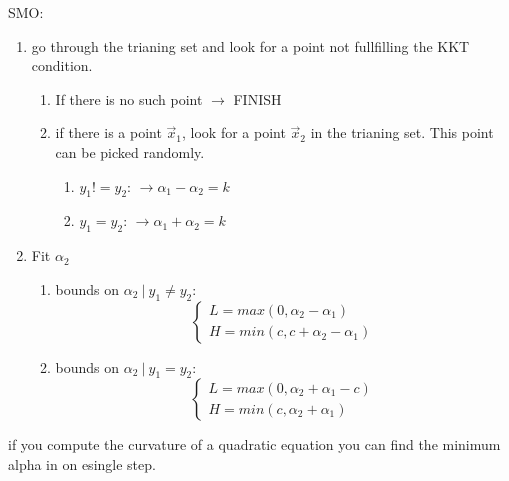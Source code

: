 \documentclass[letterpaper, 9pt]{article}
\begin{document}
SMO:\\
\begin{enumerate}
\item go through the trianing set and look for a point not fullfilling the KKT condition.
\begin{enumerate}
\item If there is no such point $\rightarrow$ FINISH
\item if there is a point $\vec{x}_1$, look for a point $\vec{x}_2$ in the trianing set. This point can be picked randomly.
\begin{enumerate}
\item $y_1 != y_2$: $\rightarrow \alpha_1 - \alpha_2 = k$
\item $y_1 = y_2$: $\rightarrow \alpha_1 + \alpha_2 = k$
\end{enumerate}
\end{enumerate}
\item Fit $\alpha_2$
\begin{enumerate}
\item bounds on $\alpha_2~|~y_1\neq y_2$:
\begin{equation}
\begin{cases}
L = max(0, \alpha_2 - \alpha_1) \\
H = min(c, c + \alpha_2 - \alpha_1)
\end{cases}
\end{equation}
\item bounds on $\alpha_2~|~y_1=y_2$:
\begin{equation}
\begin{cases}
L = max(0, \alpha_2 + \alpha_1- c) \\
H = min(c, \alpha_2 + \alpha_1)
\end{cases}
\end{equation}
\end{enumerate}
\end{enumerate}

if you compute the curvature of a quadratic equation you can find the minimum alpha in on esingle step.
\end{document}
